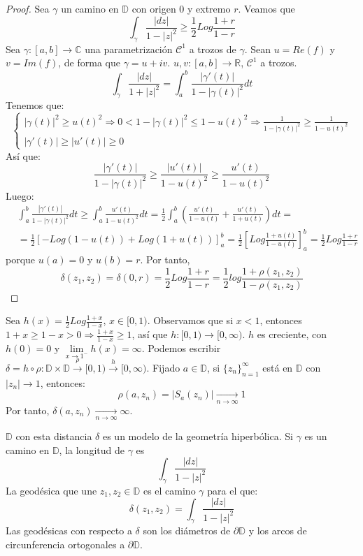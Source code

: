 \begin{proof}
    Sea $\gamma$ un camino en $\mathbb{D}$ con origen 0 y extremo $r$.
    Veamos que
    $$\int_\gamma \frac{|dz|}{1-|z|^2} \geq \frac{1}{2} Log\frac{1+r}{1-r}$$
    Sea $\gamma: [a, b] \to \mathbb{C}$ una parametrización $\mathcal{C}^1$ a trozos de $\gamma$.
    Sean $u = Re(f)$ y $v= Im(f)$, de forma que $\gamma = u + iv$.
    $u, v: [a, b] \to \mathbb{R}$, $\mathcal{C}^1$ a trozos.
    $$\int_\gamma \frac{|dz|}{1+|z|^2} = \int_a^b \frac{|\gamma'(t)|}{1-|\gamma(t)|^2}dt$$
    Tenemos que:
    $$\begin{cases}
            |\gamma(t)|^2 \geq u(t)^2 \Rightarrow 0 < 1-|\gamma(t)|^2 \leq 1-u(t)^2 \Rightarrow \frac{1}{1-|\gamma(t)|^2} \geq \frac{1}{1-u(t)^2} \\
            |\gamma'(t)| \geq |u'(t)| \geq 0
        \end{cases}$$
    Así que:
    $$\frac{|\gamma'(t)|}{1-|\gamma(t)|^2} \geq \frac{|u'(t)|}{1-u(t)^2} \geq \frac{u'(t)}{1-u(t)^2}$$
    Luego:
    \begin{align*}
         & \int_a^b \frac{|\gamma'(t)|}{1-|\gamma(t)|^2}dt \geq \int_a^b \frac{u'(t)}{1-u(t)^2}dt = \frac{1}{2} \int_a^b \left(\frac{u'(t)}{1-u(t)} + \frac{u'(t)}{1+u(t)}\right)dt = \\
         & = \frac{1}{2} \left[-Log(1-u(t)) + Log(1+u(t))\right]_a^b = \frac{1}{2} \left[Log \frac{1+u(t)}{1-u(t)}\right]_a^b = \frac{1}{2} Log\frac{1+r}{1-r}
    \end{align*}
    porque $u(a) = 0$ y $u(b) = r$.
    Por tanto,
    $$\delta(z_1, z_2) = \delta(0, r) = \frac{1}{2} Log\frac{1+r}{1-r} = \frac{1}{2} log\frac{1+\rho(z_1, z_2)}{1-\rho(z_1, z_2)}$$
\end{proof}

\begin{remark}
    Sea $h(x) = \frac{1}{2} Log \frac{1+x}{1-x}$, $x \in [0, 1)$.
    Observamos que si $x < 1$, entonces $1+x \geq 1-x > 0 \Rightarrow \frac{1+x}{1-x} \geq 1$, así que $h: [0, 1) \to [0, \infty)$.
    $h$ es creciente, con $h(0) = 0$ y $\lim\limits_{x \to 1^-} h(x) = \infty$.
    Podemos escribir $\delta = h \circ \rho : \mathbb{D} \times \mathbb{D} \xrightarrow{\rho} [0, 1) \xrightarrow{h} [0, \infty)$.
    Fijado $a \in \mathbb{D}$, si $\{z_n\}_{n=1}^\infty$ está en $\mathbb{D}$ con $|z_n| \to 1$, entonces:
    $$\rho(a, z_n) = |S_a(z_n)| \xrightarrow[n \to \infty]{} 1$$
    Por tanto, $\delta(a, z_n) \xrightarrow[n \to \infty]{} \infty$.
\end{remark}

$\mathbb{D}$ con esta distancia $\delta$ es un modelo de la geometría hiperbólica.
Si $\gamma$ es un camino en $\mathbb{D}$, la longitud de $\gamma$ es
$$\int_\gamma \frac{|dz|}{1-|z|^2}$$
La geodésica que une $z_1, z_2 \in \mathbb{D}$ es el camino $\gamma$ para el que:
$$\delta(z_1, z_2) = \int_\gamma \frac{|dz|}{1-|z|^2}$$
Las geodésicas con respecto a $\delta$ son los diámetros de $\partial \mathbb{D}$ y los arcos de circunferencia ortogonales a $\partial \mathbb{D}$.